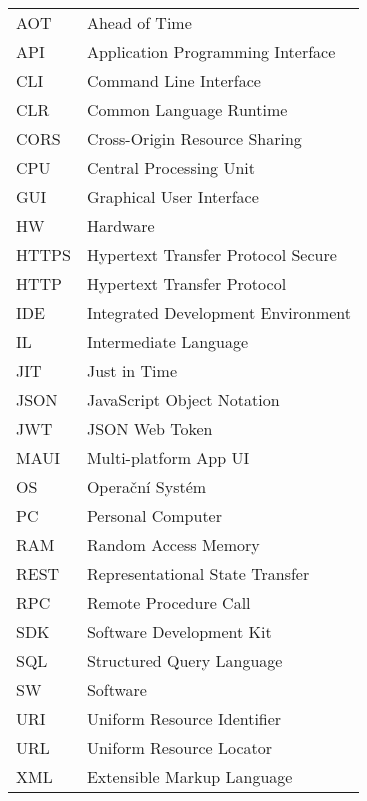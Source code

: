 
\seznamzkr

\begin{tabular}{ll}
AOT & Ahead of Time \\
API & Application Programming Interface \\
CLI & Command Line Interface \\
CLR & Common Language Runtime \\
CORS & Cross-Origin Resource Sharing \\
CPU & Central Processing Unit \\
GUI & Graphical User Interface \\
HW & Hardware \\
HTTPS & Hypertext Transfer Protocol Secure \\
HTTP & Hypertext Transfer Protocol \\
IDE & Integrated Development Environment \\
IL & Intermediate Language \\
JIT & Just in Time \\
JSON & JavaScript Object Notation \\
JWT & JSON Web Token \\
MAUI & Multi-platform App UI \\
OS & Operační Systém \\
PC & Personal Computer \\
RAM & Random Access Memory \\
REST & Representational State Transfer \\
RPC & Remote Procedure Call \\
SDK & Software Development Kit \\
SQL & Structured Query Language \\
SW & Software \\
URI & Uniform Resource Identifier \\
URL & Uniform Resource Locator \\
XML & Extensible Markup Language \\
\end{tabular}

